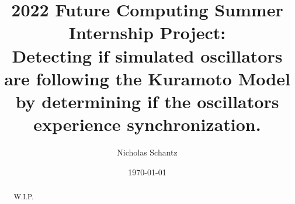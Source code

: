 \documentclass{article}
\begin{document}
    \begin{minipage}[h]{\textwidth}
        \title{2022 Future Computing Summer Internship Project:\\Detecting if simulated oscillators are following the Kuramoto Model by determining if the oscillators experience synchronization.}
        \author{Nicholas Schantz}
        \date{\today}
            \maketitle
        \begin{abstract}
        	W.I.P. 
        	

        \end{abstract}
    \end{minipage}

\ \\


\end{document}
